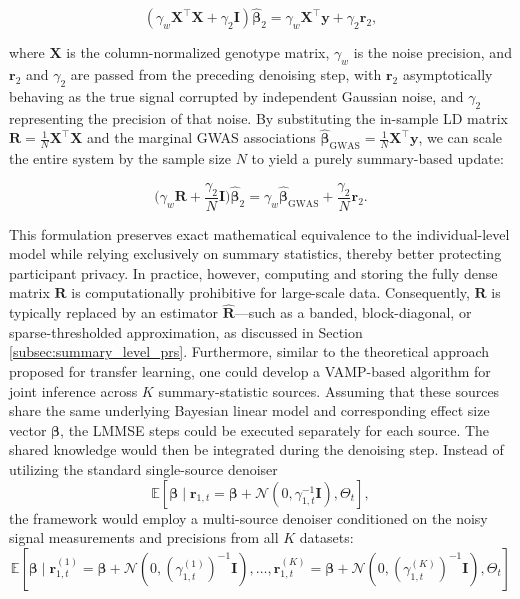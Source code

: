 \begin{equation}
(\gamma_w \bm{X}^\top \bm{X} + \gamma_2 \bm{I}) \hat{\bm{\beta}}_2 = \gamma_w \bm{X}^\top \bm{y} + \gamma_2 \bm{r}_2,
\end{equation}

where $\bm{X}$ is the column-normalized genotype matrix, $\gamma_w$ is the noise precision, and $\bm{r}_2$ and $\gamma_2$ are passed from the preceding denoising step, with $\bm{r}_2$ asymptotically behaving as the true signal corrupted by independent Gaussian noise, and $\gamma_2$ representing the precision of that noise. By substituting the in-sample LD matrix $\bm{R} = \frac{1}{N} \bm{X}^\top \bm{X}$ and the marginal GWAS associations $\hat{\bm{\beta}}_{\text{GWAS}} = \frac{1}{N} \bm{X}^\top \bm{y}$, we can scale the entire system by the sample size $N$ to yield a purely summary-based update:

\begin{equation} 
    \bigg (\gamma_w \bm{R} + \frac{\gamma_2}{N} \bm{I} \bigg ) \hat{\bm{\beta}}_2 = \gamma_w \hat{\bm{\beta}}_{\text{GWAS}} + \frac{\gamma_2}{N} \bm{r}_2.
\end{equation}

This formulation preserves exact mathematical equivalence to the individual-level model while relying exclusively on summary statistics, thereby better protecting participant privacy. In practice, however, computing and storing the fully dense matrix $\bm{R}$ is computationally prohibitive for large-scale data. Consequently, $\bm{R}$ is typically replaced by an estimator $\hat{\bm{R}}$---such as a banded, block-diagonal, or sparse-thresholded approximation, as discussed in Section \ref{subsec:summary_level_prs}. Furthermore, similar to the theoretical approach proposed for transfer learning, one could develop a VAMP-based algorithm for joint inference across $K$ summary-statistic sources. Assuming that these sources share the same underlying Bayesian linear model and corresponding effect size vector $\bm{\beta}$, the LMMSE steps could be executed separately for each source. The shared knowledge would then be integrated during the denoising step. Instead of utilizing the standard single-source denoiser 
\begin{equation}
    \mathbb{E}[\bm{\beta} \mid \bm{r}_{1,t} = \bm{\beta} + \mathcal{N}(0, \gamma_{1,t}^{-1}\bm{I}), \Theta_{t}],
\end{equation} 
the framework would employ a multi-source denoiser conditioned on the noisy signal measurements and precisions from all $K$ datasets:
\begin{equation}
    \mathbb{E}[\bm{\beta} \mid \bm{r}_{1,t}^{(1)} = \bm{\beta} + \mathcal{N}(0, (\gamma_{1,t}^{(1)})^{-1}\bm{I}), \dots, \bm{r}_{1,t}^{(K)} = \bm{\beta} + \mathcal{N}(0, (\gamma_{1,t}^{(K)})^{-1}\bm{I}), \Theta_{t}]
\end{equation}

